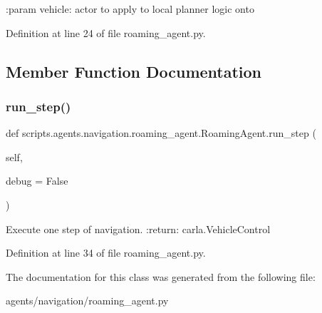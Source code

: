 \begin{DoxyVerb}:param vehicle: actor to apply to local planner logic onto
\end{DoxyVerb}
 

Definition at line 24 of file roaming\+\_\+agent.\+py.



\subsection{Member Function Documentation}
\mbox{\label{classscripts_1_1agents_1_1navigation_1_1roaming__agent_1_1RoamingAgent_a9b407a197c9f5bb59c4d18bd5508528e}} 
\subsubsection{\texorpdfstring{run\+\_\+step()}{run\_step()}}
{\footnotesize\ttfamily def scripts.\+agents.\+navigation.\+roaming\+\_\+agent.\+Roaming\+Agent.\+run\+\_\+step (\begin{DoxyParamCaption}\item[{}]{self,  }\item[{}]{debug = {\ttfamily False} }\end{DoxyParamCaption})}

\begin{DoxyVerb}Execute one step of navigation.
:return: carla.VehicleControl
\end{DoxyVerb}
 

Definition at line 34 of file roaming\+\_\+agent.\+py.



The documentation for this class was generated from the following file\+:\begin{DoxyCompactItemize}
\item 
agents/navigation/roaming\+\_\+agent.\+py\end{DoxyCompactItemize}
